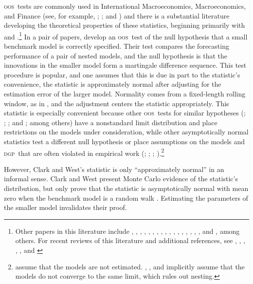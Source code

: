 \documentclass[11pt,fleqn]{article}
\theoremstyle{definition}
\newcommand{\dgp}{\textsc{dgp}}
\newcommand{\oos}{\textsc{oos}}
\begin{document}
\oos\ tests are commonly used in International Macroeconomics,
Macroeconomics, and Finance (see, for example, \citealt{MeR:83};
\citealt{StW:03}; and \citealt{GoW:08}) and there is a substantial
literature developing the theoretical properties of these statistics,
beginning primarily with \citet{DiM:95} and
\citet{Wes:96}.\footnote{Other papers in this literature include
  \citet{WeM:98}, \citet{Mcc:98,Mcc:00},
  \citet{ClM:01,ClM:05-2,ClM:05,ClM:11b,ClM:12,ClM:12b},
  \citet{CCS:01}, \citet{CoS:02,CoS:04,CoS:07}, \citet{Whi:00},
  \citet{InK:04,InK:06}, \citet{Han:05}, \citet{Ros:05},
  \citet{ClW:06,ClW:07}, \citet{Ana:07}, \citet{GiR:09,GiR:10},
  \citet{HuW:10}, \citet{HLN:11}, \cite{InR:11}, \cite{Pin:11},
  \cite{RoS:11,RoS:11b}, and \citet{Cal:11}, among others.  For recent
  reviews of this literature and additional references, see
  \citet{McW:02}, \citet{CoS:06}, \citet{Wes:06}, \citet{ClM:11c},
  \citet{CoD:11}, and \citet{Gia:11}} In a pair of papers,
\citet{ClW:06,ClW:07} develop an \oos\ test of the null hypothesis
that a small benchmark model is correctly specified.  Their test
compares the forecasting performance of a pair of nested models, and
the null hypothesis is that the innovations in the smaller model form
a martingale difference sequence.  This test procedure is popular, and
one assumes that this is due in part to the statistic's convenience,
the statistic is approximately normal after adjusting for the
estimation error of the larger model.  Normality comes from a
fixed-length rolling window, as in \citet{GiW:06}, and the adjustment
centers the statistic appropriately.  This statistic is especially
convenient because other \oos\ tests for similar hypotheses
(\citealt{CCS:01}; \citealt{ClM:01,ClM:05}; \citealt{CoS:02,CoS:04};
and \citealt{Mcc:07}; among others) have a nonstandard limit
distribution and place restrictions on the models under consideration,
while other asymptotically normal statistics test a different null
hypothesis \citep{GiW:06} or place assumptions on the models and \dgp\
that are often violated in empirical work (\citealt{DiM:95};
\citealt{Wes:96}; \citealt{WeM:98};
\citealt{Mcc:00}).\footnote{\citet{DiM:95} assume that the models are
  not estimated. \citet{Wes:96}, \citet{WeM:98}, and \citet{Mcc:00}
  implicitly assume that the models do not converge to the same limit,
  which rules out nesting.}

However, Clark and West's statistic is only ``approximately normal''
in an informal sense.  Clark and West present Monte Carlo evidence of
the statistic's distribution, but only prove that the statistic is
asymptotically normal with mean zero when the benchmark model is a
random walk \citep{ClW:06}. Estimating the parameters of the smaller
model invalidates their proof.
\end{document}
